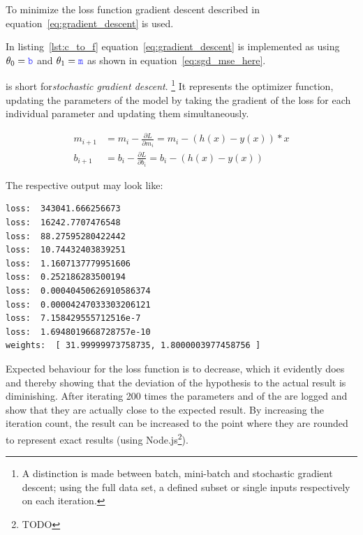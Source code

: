 To minimize the loss function gradient descent described in equation~\eqref{eq:gradient_descent}
is used.

In listing~\ref{lst:c_to_f} equation~\eqref{eq:gradient_descent} is implemented as  using
$\theta_0 = \code{b}$ and $\theta_1= \code{m}$ as shown in equation~\eqref{eq:sgd_mse_here}.

 is short for\textit{stochastic gradient descent}.
\footnote{A distinction is made between batch, mini-batch and stochastic gradient descent;
using the full data set, a defined subset or single inputs respectively on each iteration.}
It represents the optimizer function, updating the
parameters of the model by taking the gradient of the loss for each individual parameter and
updating them simultaneously.

\begin{equation} \label{eq:sgd_mse_here}
\begin{split}
m_{i+1} & = m_i - \frac{\partial L}{\partial m_i} = m_i - (h(x) - y(x)) * x \\
b_{i+1} & = b_i - \frac{\partial L}{\partial b_i} = b_i - (h(x) - y(x))
\end{split}
\end{equation}

The respective output may look like:
\begin{lstlisting}
loss:  343041.666256673
loss:  16242.7707476548
loss:  88.27595280422442
loss:  10.74432403839251
loss:  1.1607137779951606
loss:  0.252186283500194
loss:  0.00040450626910586374
loss:  0.00004247033303206121
loss:  7.158429555712516e-7
loss:  1.6948019668728757e-10
weights:  [ 31.99999973758735, 1.8000003977458756 ]
\end{lstlisting}

Expected behaviour for the loss function is to decrease, which it evidently
does and thereby showing that the deviation of the hypothesis to the actual result is diminishing.
After iterating 200 times the parameters  and  of the  are logged
and show that they are actually close to the expected result.
By increasing the iteration count, the result can be increased to the point where they are rounded
to represent exact results (using Node.js\footnote{ TODO }).

